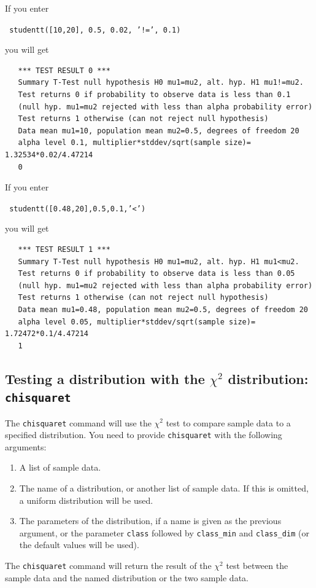 \documentclass[a4paper,11pt]{book}
\begin{document}
If you enter
\begin{center}
  \tt
  studentt([10,20], 0.5, 0.02, '!=', 0.1)
\end{center}
you will get
\begin{verbatim}
   *** TEST RESULT 0 ***
   Summary T-Test null hypothesis H0 mu1=mu2, alt. hyp. H1 mu1!=mu2.
   Test returns 0 if probability to observe data is less than 0.1
   (null hyp. mu1=mu2 rejected with less than alpha probability error)
   Test returns 1 otherwise (can not reject null hypothesis)
   Data mean mu1=10, population mean mu2=0.5, degrees of freedom 20
   alpha level 0.1, multiplier*stddev/sqrt(sample size)= 1.32534*0.02/4.47214
   0
\end{verbatim}
If you enter
\begin{center}
  \tt
  studentt([0.48,20],0.5,0.1,'<')
\end{center}
you will get
\begin{verbatim}
   *** TEST RESULT 1 ***
   Summary T-Test null hypothesis H0 mu1=mu2, alt. hyp. H1 mu1<mu2.
   Test returns 0 if probability to observe data is less than 0.05
   (null hyp. mu1=mu2 rejected with less than alpha probability error)
   Test returns 1 otherwise (can not reject null hypothesis)
   Data mean mu1=0.48, population mean mu2=0.5, degrees of freedom 20
   alpha level 0.05, multiplier*stddev/sqrt(sample size)= 1.72472*0.1/4.47214
   1
\end{verbatim}

\subsection{Testing a distribution with the $\chi^2$ distribution: \texttt{chisquaret}}

The \texttt{chisquaret} command will use the $\chi^2$ test to compare
sample data to a specified distribution.
You need to provide \texttt{chisquaret} with the following arguments:
\begin{enumerate}
  \item A list of sample data.
  \item The name of a distribution, or another list of sample data.
  If this is omitted, a uniform distribution will be used.
  \item The parameters of the distribution, if a name is given as the
  previous argument, or the parameter \texttt{class} followed by
  \texttt{class\_min} and \texttt{class\_dim} (or the default values
  will be used).
\end{enumerate}
The \texttt{chisquaret} command will return the result of the $\chi^2$
test between the sample data and the named distribution or the two
sample data.
\end{document}
